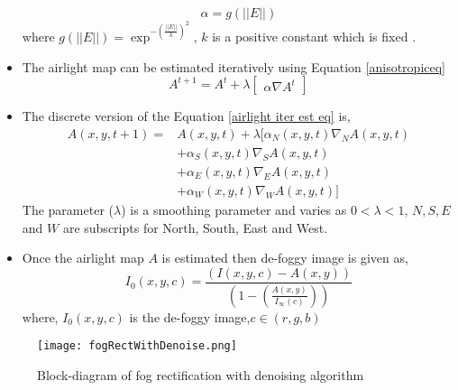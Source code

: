 \begin{itemize}
\begin{equation}\label{condeq}
\alpha=g(|| E ||)
\end{equation}   
where $g(|| E ||)=\exp^{-(\frac{||E||}{k})^2}$, $k$ is a positive constant which is fixed \cite{fogRemoval}.
\item The airlight map can be estimated iteratively using Equation \ref{anisotropiceq} \cite{anisotropic}
\begin{equation}\label{airlight iter est eq}
A^{t+1}=A^t+\lambda \begin{bmatrix}
\alpha \nabla A^t
\end{bmatrix}
\end{equation}
\item The discrete version of the Equation \ref{airlight iter est eq} is,
\begin{equation}\label{discrete airlight est}
\begin{split}
A(x,y,t+1) = & A(x,y,t) + \lambda 
[\alpha_N(x,y,t) \nabla_N A(x,y,t) \\&+ \alpha_S(x,y,t) \nabla_S A(x,y,t) \\&+ \alpha_E(x,y,t) \nabla_E A(x,y,t) \\ &+ \alpha_W(x,y,t) \nabla_W A(x,y,t)]
\end{split}
\end{equation}
The parameter ($\lambda$) is a smoothing parameter and varies as $0<\lambda<1$, $N,S,E$ and $ W$ are subscripts for North, South, East and West.
		\item Once the airlight map $A$ is estimated then de-foggy image is given as,
		\begin{equation}
		I_0(x,y,c)=\frac{(I(x,y,c)-A(x,y))}{(1-(\frac{A(x,y)}{I_\infty(c)}))}
		\end{equation}
		where, $I_0(x,y,c)$ is the de-foggy image,$c\in (r,g,b)$
\end{itemize}
\begin{figure}[h!]
	\centering
	\texttt{[image: fogRectWithDenoise.png]}
	\caption{Block-diagram of fog rectification with denoising algorithm}
	\label{fig:fog rectification algorithm}
\end{figure}
